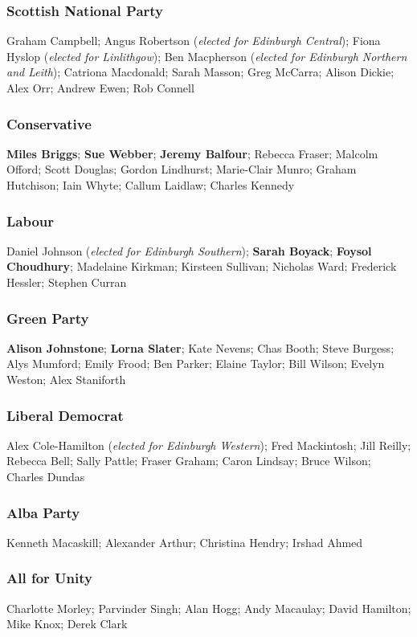 \begin{resultsiii}
	\subsubsection*{Scottish National Party}
	Graham Campbell; Angus Robertson (\emph{elected for Edinburgh Central}); Fiona Hyslop (\emph{elected for Linlithgow}); Ben Macpherson (\emph{elected for Edinburgh Northern and Leith}); Catriona Macdonald; Sarah Masson; Greg McCarra; Alison Dickie; Alex Orr; Andrew Ewen; Rob Connell
	
	\subsubsection*{Conservative}
	\textbf{Miles Briggs}; \textbf{Sue Webber}; \textbf{Jeremy Balfour}; Rebecca Fraser; Malcolm Offord; Scott Douglas; Gordon Lindhurst; Marie-Clair Munro; Graham Hutchison; Iain Whyte; Callum Laidlaw; Charles Kennedy
	
	\subsubsection*{Labour}
	Daniel Johnson (\emph{elected for Edinburgh Southern}); \textbf{Sarah Boyack}; \textbf{Foysol Choudhury}; Madelaine Kirkman; Kirsteen Sullivan; Nicholas Ward; Frederick Hessler; Stephen Curran
	
	\subsubsection*{Green Party}
	\textbf{Alison Johnstone}; \textbf{Lorna Slater}; Kate Nevens; Chas Booth; Steve Burgess; Alys Mumford; Emily Frood; Ben Parker; Elaine Taylor; Bill Wilson; Evelyn Weston; Alex Staniforth
	
	\subsubsection*{Liberal Democrat}
	Alex Cole-Hamilton (\emph{elected for Edinburgh Western}); Fred Mackintosh; Jill Reilly; Rebecca Bell; Sally Pattle; Fraser Graham; Caron Lindsay; Bruce Wilson; Charles Dundas
	
	\subsubsection*{Alba Party}
	Kenneth Macaskill; Alexander Arthur; Christina Hendry; Irshad Ahmed
	
	\subsubsection*{All for Unity}
	Charlotte Morley; Parvinder Singh; Alan Hogg; Andy Macaulay; David Hamilton; Mike Knox; Derek Clark
	

\end{resultsiii}
